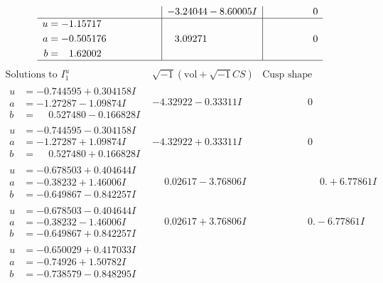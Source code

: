 \documentclass[1p]{elsarticle_modified}
\theoremstyle{definition}
\newcommand{\I}{\sqrt{-1}}
\begin{document}
$$\begin{array}{c|c|c}
 & -3.24044 - 8.60005 I & \phantom{-0.000000 } 0 \\ \hline\begin{aligned}
u &= -1.15717\phantom{ +0.000000I} \\
a &= -0.505176\phantom{ +0.000000I} \\
b &= \phantom{-}1.62002\phantom{ +0.000000I}\end{aligned}
 & \phantom{-}3.09271\phantom{ +0.000000I} & \phantom{-0.000000 } 0\\
 \hline 
 \end{array}$$\newpage$$\begin{array}{c|c|c}  
\text{Solutions to }I^u_{1}& \I (\text{vol} + \sqrt{-1}CS) & \text{Cusp shape}\\
 \hline 
\begin{aligned}
u &= -0.744595 + 0.304158 I \\
a &= -1.27287 - 1.09874 I \\
b &= \phantom{-}0.527480 - 0.166828 I\end{aligned}
 & -4.32922 - 0.33311 I & \phantom{-0.000000 } 0 \\ \hline\begin{aligned}
u &= -0.744595 - 0.304158 I \\
a &= -1.27287 + 1.09874 I \\
b &= \phantom{-}0.527480 + 0.166828 I\end{aligned}
 & -4.32922 + 0.33311 I & \phantom{-0.000000 } 0 \\ \hline\begin{aligned}
u &= -0.678503 + 0.404644 I \\
a &= -0.38232 + 1.46006 I \\
b &= -0.649867 - 0.842257 I\end{aligned}
 & \phantom{-}0.02617 - 3.76806 I & \phantom{-0.000000 -}0. + 6.77861 I \\ \hline\begin{aligned}
u &= -0.678503 - 0.404644 I \\
a &= -0.38232 - 1.46006 I \\
b &= -0.649867 + 0.842257 I\end{aligned}
 & \phantom{-}0.02617 + 3.76806 I & \phantom{-0.000000 } 0. - 6.77861 I \\ \hline\begin{aligned}
u &= -0.650029 + 0.417033 I \\
a &= -0.74926 + 1.50782 I \\
b &= -0.738579 - 0.848295 I\end{aligned}

\end{array}$$
\end{document}

